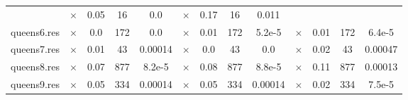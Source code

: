 \documentclass[main.tex]{subfiles}
\begin{document}
\begin{landscape}
\begin{center}
\begin{tabular}{|l|cccc|cccc|cccc|}
 & $\times$ & 0.05 & 16 & 0.0
 & $\times$ & 0.17 & 16 & 0.011
\\
queens6.res & $\times$ & 0.0 & 172 & 0.0
 & $\times$ & 0.01 & 172 & 5.2e-5
 & $\times$ & 0.01 & 172 & 6.4e-5
\\
queens7.res & $\times$ & 0.01 & 43 & 0.00014
 & $\times$ & 0.0 & 43 & 0.0
 & $\times$ & 0.02 & 43 & 0.00047
\\
queens8.res & $\times$ & 0.07 & 877 & 8.2e-5
 & $\times$ & 0.08 & 877 & 8.8e-5
 & $\times$ & 0.11 & 877 & 0.00013
\\
queens9.res & $\times$ & 0.05 & 334 & 0.00014
 & $\times$ & 0.05 & 334 & 0.00014
 & $\times$ & 0.02 & 334 & 7.5e-5
\\
\hline\end{tabular}
\end{center}
\end{landscape}
\end{document}
